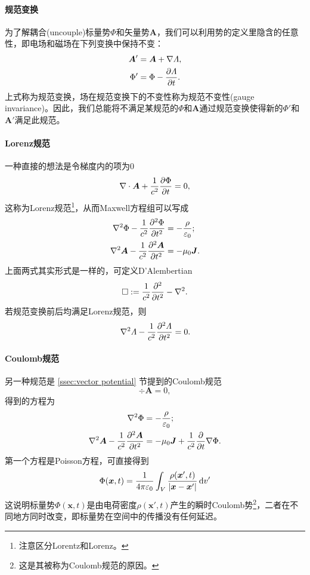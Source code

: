 \paragraph{规范变换}
为了解耦合(uncouple)标量势$\Phi$和矢量势$\bm A$，我们可以利用势的定义里隐含的任意性，即电场和磁场在下列变换中保持不变：
\begin{align}
    \bm A'&=\bm A+\nabla\varLambda,\\
    \Phi'&=\Phi-\pv\varLambda t.
\end{align}
上式称为规范变换，场在规范变换下的不变性称为规范不变性(gauge invariance)。因此，我们总能将不满足某规范的$\Phi$和$\bm A$通过规范变换使得新的$\Phi'$和$\bm A'$满足此规范。
\paragraph{Lorenz规范}
一种直接的想法是令梯度内的项为0
\begin{equation}
    \div\bm A+\frac1{c^2}\pv\Phi t=0,
\end{equation}
这称为Lorenz规范\footnote{注意区分Lorentz和Lorenz。}，从而Maxwell方程组可以写成
\begin{align}
    \lapla\Phi-\frac1{c^2}\pv[2]\Phi t&=-\frac\rho{\varepsilon_0};\\
    \lapla\bm A-\frac1{c^2}\pv[2]{\bm A}t&=-\mu_0\bm J.
\end{align}
上面两式其实形式是一样的，可定义D'Alembertian%
\begin{equation}
    \square:=\frac1{c^2}\pp[2]t-\lapla.
\end{equation}
若规范变换前后均满足Lorenz规范，则
\begin{equation}
    \lapla\varLambda-\frac1{c^2}\pv[2]\varLambda t=0.
\end{equation}
\paragraph{Coulomb规范}
另一种规范是 \ref{ssec:vector potential} 节提到的Coulomb规范
\[
    \div\bm A=0,
\]
得到的方程为
\begin{align*}
    \lapla\Phi&=-\frac\rho{\varepsilon_0};\\
    \lapla\bm A-\frac1{c^2}\pv[2]{\bm A}t&=-\mu_0\bm J+\frac1{c^2}\pp t\nabla\Phi.
\end{align*}
第一个方程是Poisson方程，可直接得到
\[
    \Phi(\bm x,t)=\frac1{4\pi\varepsilon_0}\int_V\frac{\rho(\bm x',t)}{|\bm x-\bm x'|}\d v'
\]
这说明标量势$\Phi(\bm x,t)$是由电荷密度$\rho(\bm x',t)$产生的瞬时Coulomb势\footnote{这是其被称为Coulomb规范的原因。}，二者在不同地方同时改变，即标量势在空间中的传播没有任何延迟。

